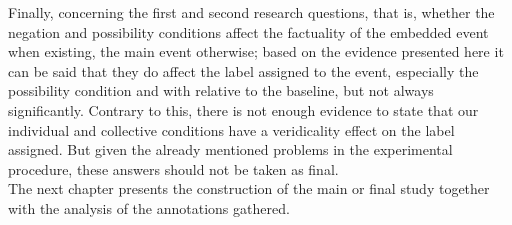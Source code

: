 Finally, concerning the first and second research questions, that is, whether the negation and possibility conditions affect the factuality of the embedded event when existing, the main event otherwise; based on the evidence presented here it can be said that they do affect the label assigned to the event, especially the possibility condition and with relative to the baseline, but not always significantly. Contrary to this, there is not enough evidence to state that our individual and collective conditions have a veridicality effect on the label assigned. But given the already mentioned problems in the experimental procedure, these answers should not be taken as final.\\

The next chapter presents the construction of the main or final study together with the analysis of the annotations gathered.